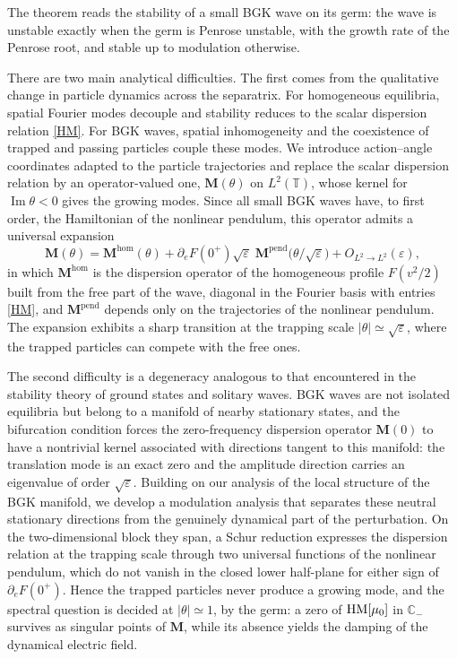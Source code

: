 \documentclass[10pt,reqno]{amsart}
\theoremstyle{definition}
\begin{document}
{The theorem reads the stability of a small BGK wave on its germ: the wave is unstable exactly when the germ is Penrose unstable, with the growth rate of the Penrose root, and stable up to modulation otherwise.

There are two main analytical difficulties. The first comes from the qualitative change in particle dynamics across the separatrix. For homogeneous equilibria, spatial Fourier modes decouple and stability reduces to the scalar dispersion relation \eqref{HM}. For BGK waves, spatial inhomogeneity and the coexistence of trapped and passing particles couple these modes. We introduce action--angle coordinates adapted to the particle trajectories and replace the scalar dispersion relation by an operator-valued one, $\mathbf M(\theta)$ on $L^2(\mathbb T)$, whose kernel for $\operatorname{Im}\theta<0$ gives the growing modes. Since all small BGK waves have, to first order, the Hamiltonian of the nonlinear pendulum, this operator admits a universal expansion
\[
\mathbf M(\theta)=\mathbf M^{\mathrm{hom}}(\theta)+\partial_eF(0^+)\sqrt \varepsilon\;\mathbf M^{\mathrm{pend}}\bigl(\theta/\sqrt \varepsilon\bigr)+O_{L^2\to L^2}(\varepsilon),
\]
in which $\mathbf M^{\mathrm{hom}}$ is the dispersion operator of the homogeneous profile $F(v^2/2)$ built from the free part of the wave, diagonal in the Fourier basis with entries \eqref{HM}, and $\mathbf M^{\mathrm{pend}}$ depends only on the trajectories of the nonlinear pendulum. The expansion exhibits a sharp transition at the trapping scale $|\theta|\simeq\sqrt \varepsilon$, where the trapped particles can compete with the free ones.

The second difficulty is a degeneracy analogous to that encountered in the stability theory of ground states and solitary waves. BGK waves are not isolated equilibria but belong to a manifold of nearby stationary states, and the bifurcation condition forces the zero-frequency dispersion operator $\mathbf M(0)$ to have a nontrivial kernel associated with directions tangent to this manifold: the translation mode is an exact zero and the amplitude direction carries an eigenvalue of order $\sqrt \varepsilon$. Building on our analysis of the local structure of the BGK manifold, we develop a modulation analysis that separates these neutral stationary directions from the genuinely dynamical part of the perturbation. On the two-dimensional block they span, a Schur reduction expresses the dispersion relation at the trapping scale through two universal functions of the nonlinear pendulum, which do not vanish in the closed lower half-plane for either sign of $\partial_eF(0^+)$. Hence the trapped particles never produce a growing mode, and the spectral question is decided at $|\theta|\simeq 1$, by the germ: a zero of $\mathrm{HM}[\mu_0]$ in $\mathbb C_-$ survives as singular points of $\mathbf M$, while its absence yields the damping of the dynamical electric field.

}
\end{document}
